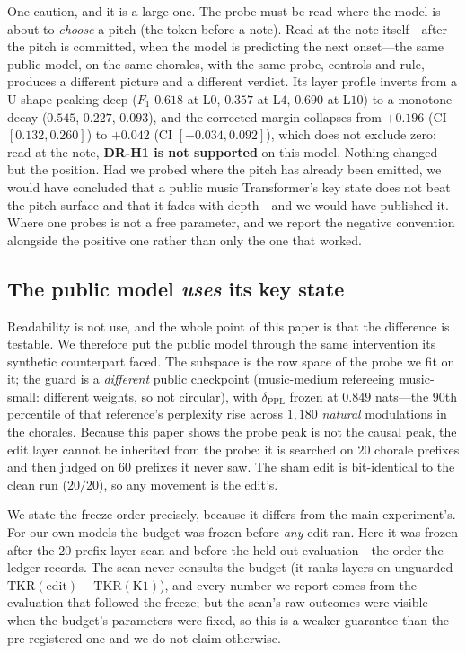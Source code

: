 \documentclass[conference]{IEEEtran}
\newcommand{\tkr}{\mathrm{TKR}}
\newcommand{\ppl}{\delta_{\mathrm{PPL}}}
\begin{document}
One caution, and it is a large one. The probe must be read where the model is about to
\emph{choose} a pitch (the token before a note). Read at the note itself---after the
pitch is committed, when the model is predicting the next onset---the same public model,
on the same chorales, with the same probe, controls and rule, produces a different
picture and a different verdict. Its layer profile inverts from a U-shape peaking deep
($F_1$ $0.618$ at L$0$, $0.357$ at L$4$, $0.690$ at L$10$) to a monotone decay ($0.545$,
$0.227$, $0.093$), and the corrected margin collapses from $+0.196$ (CI $[0.132,0.260]$)
to $+0.042$ (CI $[-0.034,0.092]$), which does not exclude zero: read at the note,
\textbf{DR-H1 is not supported} on this model. Nothing changed but the position. Had we
probed where the pitch has already been emitted, we would have concluded that a public
music Transformer's key state does not beat the pitch surface and that it fades with
depth---and we would have published it. Where one probes is not a free parameter, and we
report the negative convention alongside the positive one rather than only the one that
worked.

\subsection{The public model \emph{uses} its key state}
\label{sec:wildcausal}
Readability is not use, and the whole point of this paper is that the difference is
testable. We therefore put the public model through the same intervention its synthetic
counterpart faced. The subspace is the row space of the probe we fit on it; the guard is
a \emph{different} public checkpoint (music-medium refereeing music-small: different
weights, so not circular), with $\ppl$ frozen at $0.849$ nats---the $90$th percentile of
that reference's perplexity rise across $1{,}180$ \emph{natural} modulations in the
chorales. Because this paper shows the probe peak is not the causal peak, the edit layer
cannot be inherited from the probe: it is searched on $20$ chorale prefixes and then
judged on $60$ prefixes it never saw. The sham edit is bit-identical to the clean run
($20/20$), so any movement is the edit's.

We state the freeze order precisely, because it differs from the main experiment's. For
our own models the budget was frozen before \emph{any} edit ran. Here it was frozen after
the $20$-prefix layer scan and before the held-out evaluation---the order the ledger
records. The scan never consults the budget (it ranks layers on unguarded
$\tkr(\text{edit})-\tkr(\text{K1})$), and every number we report comes from the
evaluation that followed the freeze; but the scan's raw outcomes were visible when the
budget's parameters were fixed, so this is a weaker guarantee than the pre-registered one
and we do not claim otherwise.
\end{document}
